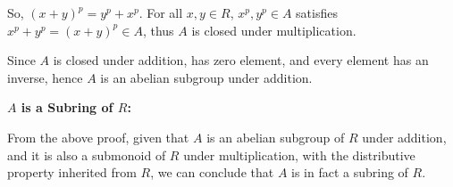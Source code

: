 \documentclass{article}
\begin{document}
So, $(x+y)^p = y^p + x^p$. For all $x,y\in R$, $x^p, y^p\in A$ satisfies $x^p+y^p = (x+y)^p \in A$, thus $A$ is closed under multiplication.

Since $A$ is closed under addition, has zero element, and every element has an inverse, hence $A$ is an abelian subgroup under addition.

\hfill

\textbf{$A$ is a Subring of $R$:}

From the above proof, given that $A$ is an abelian subgroup of $R$ under addition, and it is also a submonoid of $R$ under multiplication,
with the distributive property inherited from $R$, we can conclude that $A$ is in fact a subring of $R$.
\end{document}
